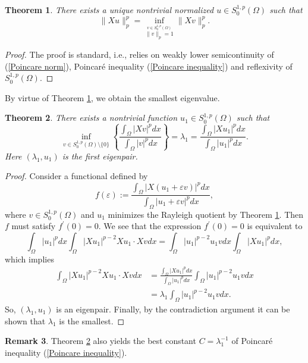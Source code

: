 \documentclass[a4paper,12pt,reqno]{amsart}
\renewcommand\eqref[1]{(\ref{#1})} %
\numberwithin{equation}{section}
\theoremstyle{plain}
\newtheorem{thm}{Theorem}[section]
\theoremstyle{definition}
\newtheorem{rem}[thm]{Remark}
\begin{document}
\begin{thm}\label{existence and uniqueness of the Rayleigh quotient}
There exists a unique nontrivial normalized $u\in S_{0}^{1,p}(\Omega)$  such that
 $$\|Xu\|_{p}^{p}=\inf_{\stackrel{v \in S_{0}^{1,p}(\Omega)}{\|v\|_{p}=1}}\|Xv\|_{p}^{p}.$$
\end{thm}
\begin{proof}
The proof is standard, i.e., relies on weakly lower semicontinuity of \eqref{Poincare norm}, Poincar\'e inequality \eqref{Poincare inequality} and reflexivity of $S_{0}^{1,p} (\Omega)$.
\end{proof} 

By virtue of Theorem \ref{existence and uniqueness of the Rayleigh quotient}, we obtain the smallest eigenvalue.
\begin{thm}\label{minimization theorem}
There exists a nontrivial function $u_{1}\in S_{0}^{1,p}(\Omega)$ such that 
\begin{equation*}
\inf_{v \in S_{0}^{1,p}(\Omega)\setminus\{0\}}\left\{\frac{\int_{\Omega}|X v|^{p} d x}{\int_{\Omega}|v|^{p} d x}\right\}=\lambda_{1}=\frac{\int_{\Omega}|X u_{1}|^{p} d x}{\int_{\Omega}|u_{1}|^{p} d x}.
\end{equation*}
Here $(\lambda_{1}, u_{1})$ is the first eigenpair.
\end{thm}
\begin{proof}
Consider a functional defined by
\begin{equation*}
f(\varepsilon):=\frac{\int_{\Omega}|X(u_{1}+\varepsilon v)|^{p} d x}{\int_{\Omega}|u_{1}+\varepsilon v|^{p} d x},
\end{equation*}
where $v\in S_{0}^{1,p}(\Omega)$ and  $u_{1}$ minimizes the Rayleigh quotient by Theorem \ref{existence and uniqueness of the Rayleigh quotient}. Then $f$ must satisfy $f^{\prime}(0)=0$. 
We see that the expression $f^{\prime}(0)=0$ is equivalent to
\begin{equation*}
\int_{\Omega}|u_{1}|^{p} d x \int_{\Omega}|X u_{1}|^{p-2} X u_{1} \cdot X v d x=\int_{\Omega}|u_{1}|^{p-2} u_{1} v d x \int_{\Omega}|X u_{1}|^{p} d x,
\end{equation*}
which implies
\begin{equation*}
\begin{aligned}
\int_{\Omega}|X u_{1}|^{p-2} X u_{1} \cdot X v d x &=\frac{\int_{\Omega}|X u_{1}|^{p} d x}{\int_{\Omega}|u_{1}|^{p} d x} \int_{\Omega}|u_{1}|^{p-2} u_{1} v d x\\
&=\lambda_{1} \int_{\Omega}|u_{1}|^{p-2} u_{1} v d x.
\end{aligned}
\end{equation*}
So, $(\lambda_{1}, u_{1})$ is an eigenpair. Finally, by the contradiction argument it can be shown that $\lambda_{1}$ is the smallest.
\end{proof}
\begin{rem}\label{the best constant of Poincare}
Theorem \ref{minimization theorem} also yields the best constant $C=\lambda_{1}^{-1}$ of  Poincar\'e inequality \eqref{Poincare inequality}.
\end{rem}
\end{document}
